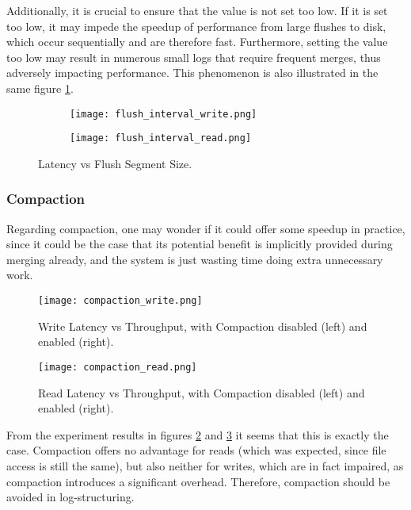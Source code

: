 Additionally, it is crucial to ensure that the value is not set too low. If it is set too low, it may impede the speedup of performance from large flushes to disk, which occur sequentially and are therefore fast. Furthermore, setting the value too low may result in numerous small logs that require frequent merges, thus adversely impacting performance. This phenomenon is also illustrated in the same figure \ref{fig:flush_interval_write_read}.

\begin{figure}[H]
    \begin{subfigure}{.5\textwidth}
        \centering
        \texttt{[image: flush\_interval\_write.png]}
    \end{subfigure}
    \begin{subfigure}{.5\textwidth}
        \centering
        \texttt{[image: flush\_interval\_read.png]}
    \end{subfigure}
    \caption{Latency vs Flush Segment Size.}
    \label{fig:flush_interval_write_read}
\end{figure}

\subsubsection{Compaction}

Regarding compaction, one may wonder if it could offer some speedup in practice, since it could be the case that its potential benefit is implicitly provided during merging already, and the system is just wasting time doing extra unnecessary work.

\begin{figure}[H]
    \centering
    \texttt{[image: compaction\_write.png]}
    \caption{Write Latency vs Throughput, with Compaction disabled (left) and enabled (right).}
    \label{fig:compaction-write}
\end{figure}

\begin{figure}[H]
    \centering
    \texttt{[image: compaction\_read.png]}
    \caption{Read Latency vs Throughput, with Compaction disabled (left) and enabled (right).}
    \label{fig:compaction_read}
\end{figure}

From the experiment results in figures \ref{fig:compaction-write} and \ref{fig:compaction_read} it seems that this is exactly the case. Compaction offers no advantage for reads (which was expected, since file access is still the same), but also neither for writes, which are in fact impaired, as compaction introduces a significant overhead. Therefore, compaction should be avoided in log-structuring.

